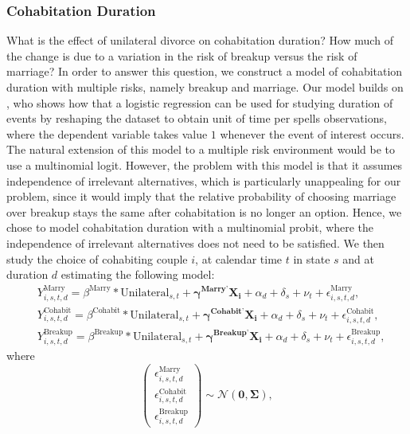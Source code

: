 \documentclass[12pt]{article}
\newcommand{\myvec}[1]{\ensuremath{\begin{pmatrix}#1\end{pmatrix}}}
\numberwithin{table}{section}
\begin{document}
\subsubsection*{Cohabitation Duration}
What is the effect of unilateral divorce on cohabitation duration? How much of the change is due to a variation in the risk of breakup versus the risk of marriage? In order to answer this question, we construct a model of cohabitation duration with multiple risks, namely breakup and marriage. Our model builds on \cite{jenkins1995}, who shows how that a logistic regression can be used for studying duration of events by reshaping the dataset to obtain unit of time per spells observations, where the dependent variable takes value $1$ whenever the event of interest occurs. The natural extension of this model to a multiple risk environment would be to use a multinomial logit. However, the problem with this model is that it assumes independence of irrelevant alternatives, which is particularly unappealing for our problem, since it would imply that the relative probability of choosing marriage over breakup stays the same after cohabitation is no longer an option. Hence, we chose to model cohabitation duration with a multinomial probit, where the independence of irrelevant alternatives does not need to be satisfied. We then study the choice of cohabiting couple $i$, at calendar time $t$ in state $s$ and at duration $d$ estimating the following model: 
\begin{equation}\label{eq:probit_1}
\begin{split}
&Y_{i,s,t,d}^\text{Marry}=\beta^\text{Marry}*\text{Unilateral}_{s,t}+\mathbf{\gamma^{\text{Marry'}}}\mathbf{X_i}+\alpha_d+\delta_s+\nu_t+\epsilon^{\text{Marry}}_{i,s,t,d},\\&
Y_{i,s,t,d}^\text{Cohabit}=\beta^\text{Cohabit}*\text{Unilateral}_{s,t}+\mathbf{\gamma^{\text{Cohabit'}}}\mathbf{X_i}+\alpha_d+\delta_s+\nu_t+\epsilon^{\text{Cohabit}}_{i,s,t,d},\\&
Y_{i,s,t,d}^\text{Breakup}=\beta^\text{Breakup}*\text{Unilateral}_{s,t}+\mathbf{\gamma^{\text{Breakup'}}}\mathbf{X_i}+\alpha_d+\delta_s+\nu_t+\epsilon^{\text{Breakup}}_{i,s,t,d},
\end{split}
\end{equation}
where
\begin{equation}\label{eq:probit_error}
\myvec{\epsilon_{i,s,t,d}^{\text{Marry}}\\\epsilon_{i,s,t,d}^{\text{Cohabit}}\\\epsilon_{i,s,t,d}^{\text{Breakup}}}\sim\mathcal{N}(\mathbf{0},\mathbf{\Sigma}),
\end{equation}
\end{document}
